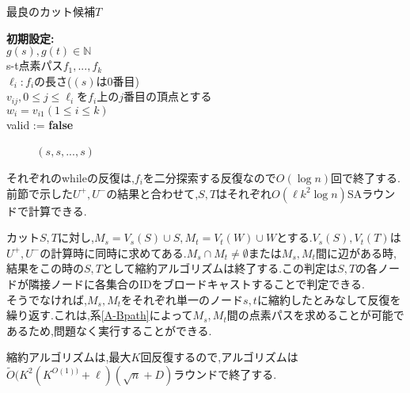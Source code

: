 \documentclass{thesis}
\theoremstyle{definition}
\begin{document}
\begin{algorithm}[H]
  \caption{最良のカット候補$T$} 
  \textbf{初期設定:} \\
  $g(s),g(t)\in \mathbb{N}$ \\
  s-t点素パス$f_1,...,f_k$ \\
  $\ell_i:f_i$の長さ($(s)$は0番目) \\
  $v_{ij},0 \leq j \leq \ell_i$を$f_i$上の$j$番目の頂点とする \\
  $w_i=v_{i1}(1\leq i \leq k)$ \\
  valid := \textbf{false} \\ 
  {\setlength{\baselineskip}{12pt}
  \begin{algorithmic}[1]
       
       
           
           
          \Else
          \EndIf　
          \EndWhile　
    \EndFor
    \Else
     $(s,s,...,s)$
    \EndIf
  \end{algorithmic}
  }
\end{algorithm}

それぞれのwhileの反復は,$f_i$を二分探索する反復なので$O(\log n)$回で終了する.前節で示した$U^+,U^-$の結果と合わせて,$S,T$はそれぞれ$O(\ell k^2 \log n)$SAラウンドで計算できる.\par
カット$S,T$に対し,$M_s = V_s(S) \cup S,M_t = V_t(W) \cup W$とする.$V_s(S),V_t(T)$は$U^+,U^-$の計算時に同時に求めてある.$M_s \cap M_t \neq \emptyset $または$M_s,M_t$間に辺がある時,結果をこの時の$S,T$として縮約アルゴリズムは終了する.この判定は$S,T$の各ノードが隣接ノードに各集合のIDをブロードキャストすることで判定できる.\\
そうでなければ,$M_s,M_t$をそれぞれ単一のノード$s,t$に縮約したとみなして反復を繰り返す.これは,系\ref{A-Bpath}によって$M_s,M_t$間の点素パスを求めることが可能であるため,問題なく実行することができる.\par
縮約アルゴリズムは,最大$K$回反復するので,アルゴリズムは$\tilde{O}(K^2(K^{O(1))}+\ell)(\sqrt{n}+D)$ラウンドで終了する.
\end{document}

